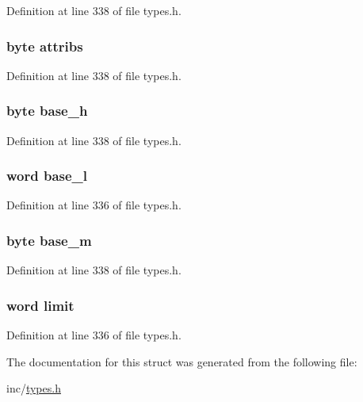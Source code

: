 Definition at line 338 of file types.h.

\hypertarget{struct_d_e_s_c_r___s_e_g_addb2c00f31ab98af1ca1d6c8190059ac}{
\subsubsection[{attribs}]{\setlength{\rightskip}{0pt plus 5cm}byte {\bf attribs}}}
\label{struct_d_e_s_c_r___s_e_g_addb2c00f31ab98af1ca1d6c8190059ac}


Definition at line 338 of file types.h.

\hypertarget{struct_d_e_s_c_r___s_e_g_a65dd6766eb6584c25d200c8cb88bac0d}{
\subsubsection[{base\_\-h}]{\setlength{\rightskip}{0pt plus 5cm}byte {\bf base\_\-h}}}
\label{struct_d_e_s_c_r___s_e_g_a65dd6766eb6584c25d200c8cb88bac0d}


Definition at line 338 of file types.h.

\hypertarget{struct_d_e_s_c_r___s_e_g_a224f2e6e6450f9962b95fdb072f418b3}{
\subsubsection[{base\_\-l}]{\setlength{\rightskip}{0pt plus 5cm}word {\bf base\_\-l}}}
\label{struct_d_e_s_c_r___s_e_g_a224f2e6e6450f9962b95fdb072f418b3}


Definition at line 336 of file types.h.

\hypertarget{struct_d_e_s_c_r___s_e_g_a5c4cfa8b9f24cf1ee0523cdc8ee7cbe3}{
\subsubsection[{base\_\-m}]{\setlength{\rightskip}{0pt plus 5cm}byte {\bf base\_\-m}}}
\label{struct_d_e_s_c_r___s_e_g_a5c4cfa8b9f24cf1ee0523cdc8ee7cbe3}


Definition at line 338 of file types.h.

\hypertarget{struct_d_e_s_c_r___s_e_g_ab5c3c0a36eb16002f03ae8565e505e89}{
\subsubsection[{limit}]{\setlength{\rightskip}{0pt plus 5cm}word {\bf limit}}}
\label{struct_d_e_s_c_r___s_e_g_ab5c3c0a36eb16002f03ae8565e505e89}


Definition at line 336 of file types.h.



The documentation for this struct was generated from the following file:\begin{DoxyCompactItemize}
\item 
inc/\hyperlink{types_8h}{types.h}\end{DoxyCompactItemize}
